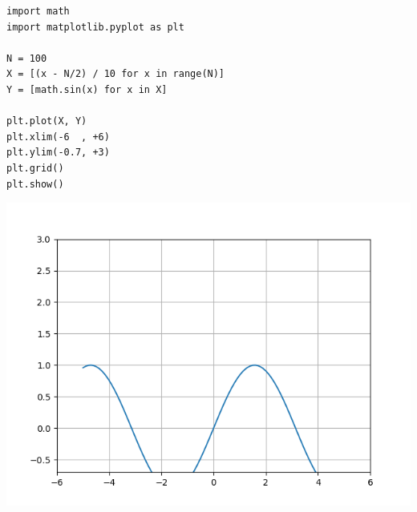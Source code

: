 
\begin{frame}[fragile]
%
\begin{codebox}[Example: Manually Scaled Axes, width=.53\linewidth, nobeforeafter, equal height group = grpXmpSimplePlotScale]
\begin{verbatim}
import math
import matplotlib.pyplot as plt

N = 100
X = [(x - N/2) / 10 for x in range(N)]
Y = [math.sin(x) for x in X]

plt.plot(X, Y)
plt.xlim(-6  , +6)
plt.ylim(-0.7, +3)
plt.grid()
plt.show()
\end{verbatim}
\end{codebox}
%
\begin{tcolorbox}[title=Output: Manually Scaled Axes, width=.45\linewidth, nobeforeafter, equal height group = grpXmpSimplePlotScale]
	\includegraphics[width=\linewidth]{./gfx/plt-limits}
\end{tcolorbox}
%
\end{frame}


